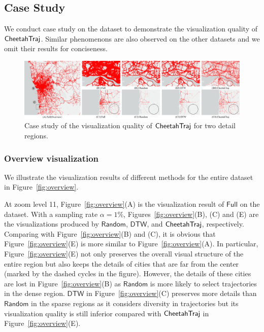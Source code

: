 \subsection{Case Study}\label{sec:case}

We conduct case study on the \pt{} dataset to demonstrate the visualization quality of $\mathsf{CheetahTraj}$. Similar phenomenons are also observed on the other datasets and we omit their results for conciseness.

\begin{figure}[t]
	\centering
	\includegraphics[width=1\textwidth]{pictures/case_study_icde/case_study_detail.pdf}
	\trim
	\caption{Case study of the visualization quality of $\mathsf{CheetahTraj}$ for two detail regions.}
	\label{fig:detailview}
	\trim \trim
\end{figure}

\subsubsection{Overview visualization}

We illustrate the visualization results of different methods for the entire \pt{} dataset in Figure~\ref{fig:overview}.

At zoom level 11, Figure~\ref{fig:overview}(A) is the visualization result of $\mathsf{Full}$ on the \pt{} dataset.
With a sampling rate $\alpha \!=\! 1\%$, Figures~\ref{fig:overview}(B), (C) and (E) are the visualizations produced by $\mathsf{Random}$, $\mathsf{DTW}$,
and $\mathsf{CheetahTraj}$, respectively. Comparing with Figure~\ref{fig:overview}(B) and (C), it is obvious that Figure~\ref{fig:overview}(E) is more similar to Figure~\ref{fig:overview}(A). In particular, Figure~\ref{fig:overview}(E) not only preserves the overall visual structure of the entire region but also keeps the details of cities that are far from the center (marked by the dashed cycles in the figure). However, the details of these cities are lost in Figure~\ref{fig:overview}(B) as $\mathsf{Random}$ is more likely to select trajectories in the dense region. $\mathsf{DTW}$ in Figure~\ref{fig:overview}(C) preserves more details than $\mathsf{Random}$ in the sparse regions as it considers diversity in trajectories but its visualization quality is still inferior compared with $\mathsf{CheetahTraj}$ in Figure~\ref{fig:overview}(E).

